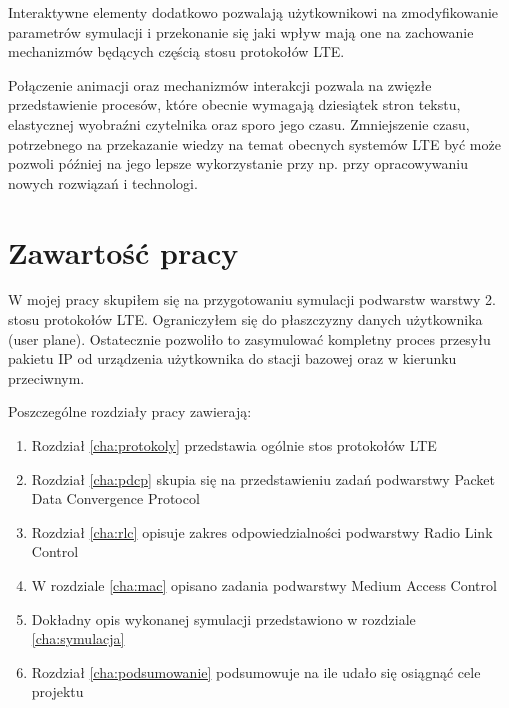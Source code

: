 Interaktywne elementy dodatkowo pozwalają użytkownikowi na zmodyfikowanie parametrów symulacji i przekonanie się jaki wpływ mają one na zachowanie mechanizmów będących częścią stosu protokołów LTE.

Połączenie animacji oraz mechanizmów interakcji pozwala na zwięzłe przedstawienie procesów, które obecnie wymagają dziesiątek stron tekstu, elastycznej wyobraźni czytelnika oraz sporo jego czasu. Zmniejszenie czasu, potrzebnego na przekazanie wiedzy na temat obecnych systemów LTE być może pozwoli później na jego lepsze wykorzystanie przy np. przy opracowywaniu nowych rozwiązań i technologi.

\section{Zawartość pracy}
\label{sec:zawartoscPracy}

W mojej pracy skupiłem się na przygotowaniu symulacji podwarstw warstwy 2. stosu protokołów LTE. Ograniczyłem się do płaszczyzny danych użytkownika (user plane). Ostatecznie pozwoliło to zasymulować kompletny proces przesyłu pakietu IP od urządzenia użytkownika do stacji bazowej oraz w kierunku przeciwnym.

Poszczególne rozdziały pracy zawierają:

\begin{enumerate}%

\item Rozdział \ref{cha:protokoly} przedstawia ogólnie stos protokołów LTE
\item Rozdział \ref{cha:pdcp} skupia się na przedstawieniu zadań podwarstwy Packet Data Convergence Protocol
\item Rozdział \ref{cha:rlc} opisuje zakres odpowiedzialności podwarstwy Radio Link Control
\item W rozdziale \ref{cha:mac} opisano zadania podwarstwy Medium Access Control\item Dokładny opis wykonanej symulacji przedstawiono w rozdziale \ref{cha:symulacja}
\item Rozdział \ref{cha:podsumowanie} podsumowuje na ile udało się osiągnąć cele projektu

\end{enumerate}
